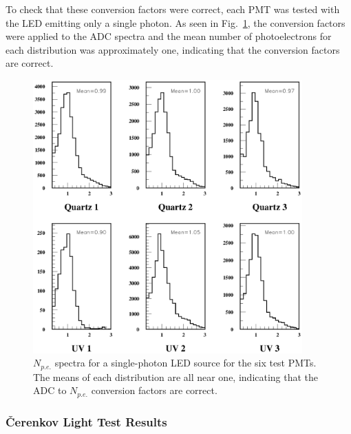 To check that these conversion factors were correct, each PMT was tested
with the LED emitting only a single photon.  As seen in 
Fig.~\ref{numphe_check}, the conversion factors were applied to the ADC 
spectra and the mean number of photoelectrons for each distribution was 
approximately one, indicating that the conversion factors are correct. 

\begin{figure}
\hspace{0.5cm}
\begin{centering}
\includegraphics[height=10.5cm]{PMT-studies/al_phe.eps}
\vspace{0.5cm}
\caption{\small{$N_{p.e.}$ spectra for a single-photon LED source for 
the six test PMTs.  The means of each distribution are all near one, 
indicating that the ADC to $N_{p.e.}$ conversion factors are correct.}}
\label{numphe_check}
\end{centering}
\end{figure}

\subsubsection{{\v C}erenkov Light Test Results}

